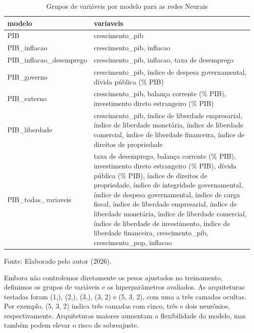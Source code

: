 \begin{table}[htbp]
	\centering
	\captionsetup{justification=centering}
	\caption{Grupos de variáveis por modelo para as redes Neurais}
	\label{tab:grupos_rn}
	
	\scriptsize
	\setlength{\tabcolsep}{2pt}
	\renewcommand{\arraystretch}{1.3}
	
	\begin{tabularx}{\textwidth}{>{\RaggedRight\arraybackslash}X>{\RaggedRight\arraybackslash}X}
		\toprule
		modelo & variaveis \\
		\midrule
		PIB & crescimento\_pib \\
		PIB\_inflacao & crescimento\_pib, inflacao \\
		PIB\_inflacao\_desemprego & crescimento\_pib, inflacao, taxa de desemprego \\
		PIB\_governo & crescimento\_pib, índice de despesa governamental, dívida pública (\% PIB) \\
		PIB\_externo & crescimento\_pib, balança corrente (\% PIB), investimento direto estrangeiro (\% PIB) \\
		PIB\_liberdade & crescimento\_pib, índice de liberdade empresarial, índice de liberdade monetária, índice de liberdade comercial, índice de liberdade financeira, índice de direitos de propriedade \\
		PIB\_todas\_variaveis & taxa de desemprego, balança corrente (\% PIB), investimento direto estrangeiro (\% PIB), dívida pública (\% PIB), índice de direitos de propriedade, índice de integridade governamental, índice de despesa governamental, índice de carga fiscal, índice de liberdade empresarial, índice de liberdade monetária, índice de liberdade comercial, índice de liberdade de investimento, índice de liberdade financeira, crescimento\_pib, crescimento\_pop, inflacao \\
		\bottomrule
	\end{tabularx}
	
	
	\vspace{0.1cm}
	
	\small Fonte: Elaborado pelo autor (2026).
\end{table}

Embora não controlemos diretamente os pesos ajustados no treinamento, definimos os grupos de variáveis e os hiperparâmetros avaliados. As arquiteturas testadas foram (1,), (2,), (3,), (3, 2) e (5, 3, 2), com uma a três camadas ocultas. Por exemplo, (5, 3, 2) indica três camadas com cinco, três e dois neurônios, respectivamente. Arquiteturas maiores aumentam a flexibilidade do modelo, mas também podem elevar o risco de sobreajuste.

